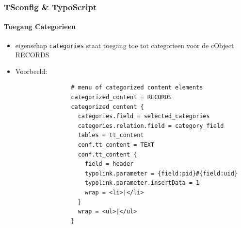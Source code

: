 
\begin{frame}[fragile]
	\frametitle{TSconfig \& TypoScript}
	\framesubtitle{Toegang Categorieen}

	\begin{itemize}
		\item eigenschap \texttt{categories} staat toegang toe tot categorieen\newline
			voor de cObject RECORDS

		\item Voorbeeld:

			\lstset{
				basicstyle=\tiny\ttfamily
			}

			\begin{lstlisting}
				# menu of categorized content elements
				categorized_content = RECORDS
				categorized_content {
				  categories.field = selected_categories
				  categories.relation.field = category_field
				  tables = tt_content
				  conf.tt_content = TEXT
				  conf.tt_content {
				    field = header
				    typolink.parameter = {field:pid}#{field:uid}
				    typolink.parameter.insertData = 1
				    wrap = <li>|</li>
				  }
				  wrap = <ul>|</ul>
				}
			\end{lstlisting}

	\end{itemize}

\end{frame}


